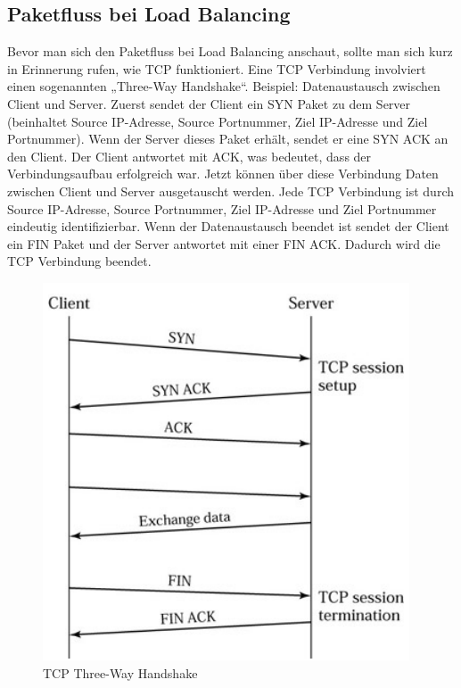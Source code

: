 \pagebreak
\subsection{Paketfluss bei Load Balancing}
\label{sec:Paketfluss bei Load Balancing}

Bevor man sich den Paketfluss bei Load Balancing anschaut, sollte man sich kurz in Erinnerung rufen, wie TCP funktioniert. Eine TCP Verbindung involviert einen sogenannten „Three-Way Handshake“. Beispiel: Datenaustausch zwischen Client und Server. Zuerst sendet der Client ein SYN Paket zu dem Server (beinhaltet Source IP-Adresse, Source Portnummer, Ziel IP-Adresse und Ziel Portnummer). Wenn der Server dieses Paket erhält, sendet er eine SYN ACK an den Client. Der Client antwortet mit ACK, was bedeutet, dass der Verbindungsaufbau erfolgreich war. Jetzt können über diese Verbindung Daten zwischen Client und  Server ausgetauscht werden. Jede TCP Verbindung ist durch Source IP-Adresse, Source Portnummer, Ziel IP-Adresse und Ziel Portnummer eindeutig identifizierbar. Wenn der Datenaustausch beendet ist sendet der Client ein FIN Paket und der Server antwortet mit einer FIN ACK. Dadurch wird die TCP Verbindung beendet. \cite{LoadBalancing2}

\begin{figure}[!h]
	\begin{center}
		\includegraphics[width=0.6\linewidth]{images/loadbalancing9.jpg}
		\caption{TCP Three-Way Handshake \cite{LoadBalancing2}}
		\label{TCP Three-Way Handshake}
	\end{center}
\end{figure}

